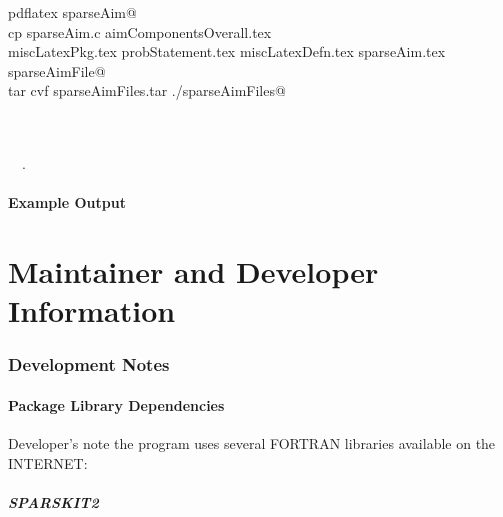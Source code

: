 \documentclass{article}
\begin{document}
\begin{flushleft}
\begin{minipage}{\linewidth}
\begin{list}{}{}
\mbox{}\verb@        pdflatex sparseAim@\\
\mbox{}\verb@        cp sparseAim.c  aimComponentsOverall.tex  \@\\
\mbox{}\verb@        miscLatexPkg.tex probStatement.tex miscLatexDefn.tex sparseAim.tex \@\\
\mbox{}\verb@        sparseAimFile@\\
\mbox{}\verb@        tar cvf sparseAimFiles.tar ./sparseAimFiles@\\
\mbox{}\verb@@\\
\mbox{}\verb@@\\
\mbox{}\verb@@{\NWsep}
\end{list}
\vspace{-1.5ex}
\footnotesize
\begin{list}{}{\setlength{\itemsep}{-\parsep}\setlength{\itemindent}{-\leftmargin}}
\item \NWtxtIdentsUsed\nobreak\  \verb@w@\nobreak\ .
\item{}
\end{list}
\end{minipage}\vspace{4ex}
\end{flushleft}
\subsection{Example Output}
\label{sec:output}


\newpage
\part{Maintainer and Developer  Information}
\section{Development Notes}

\subsection{Package Library Dependencies}
\label{sec:pkg}

Developer's note the program uses several FORTRAN
libraries available on the INTERNET:


\subsubsection{ SPARSKIT2}
\end{document}
